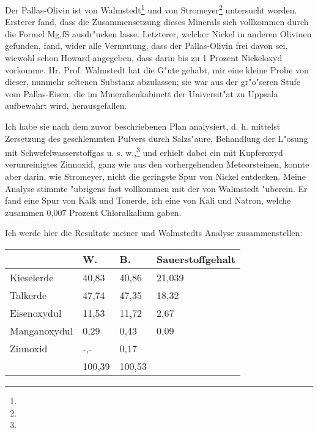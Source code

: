 \documentclass[a4paper, 11pt, oneside]{article}
\begin{document}
Der Pallas-Olivin ist von Walmstedt\footnote{} und von Stromeyer\footnote{} untersucht worden. Ersterer fand, dass die Zusammensetzung dieses Minerals sich vollkommen durch die Formel {Mg,f}S ausdr"ucken lasse. Letzterer, welcher Nickel in anderen Olivinen gefunden, fand, wider alle Vermutung, dass der Pallas-Olivin frei davon sei, wiewohl schon Howard angegeben, dass darin bis zu 1 Prozent Nickeloxyd vorkomme. Hr. Prof. Walmstedt hat die G"ute gehabt, mir eine kleine Probe von dieser, nunmehr seltenen Substanz abzulassen; sie war aus der gr"o"seren Stufe vom Pallas-Eisen, die im Mineralienkabinett der Universit"at zu Uppsala aufbewahrt wird, herausgefallen.

Ich habe sie nach dem zuvor beschriebenen Plan analysiert, d. h. mittelst Zersetzung des geschlemmten Pulvers durch Salzs"aure, Behandlung der L"osung mit Schwefelwasserstoffgas u. s. w.,\footnote{} und erhielt dabei ein mit Kupferoxyd verunreinigtes Zinnoxid, ganz wie aus den vorhergehenden Meteorsteinen, konnte aber darin, wie Stromeyer, nicht die geringste Spur von Nickel entdecken. Meine Analyse stimmte "ubrigens fast vollkommen mit der von Walmstedt "uberein. Er fand eine Spur von Kalk und Tonerde, ich eine von Kali und Natron, welche zusammen 0,007 Prozent Chloralkalium gaben.

Ich werde hier die Resultate meiner und Walmstedts Analyse zusammenstellen:
\begin{center}
\begin{tabular}{ |p{30mm}|p{20mm}|p{20mm}|p{35mm}| }
    \hline
      & W. & B. & Sauerstoffgehalt\\\hline
      Kieselerde & 40,83 & 40,86 & 21,039\\\hline
      Talkerde & 47,74 & 47,35 & 18,32\\\hline
      Eisenoxydul & 11,53 & 11,72 & 2,67\\\hline
      Manganoxydul & 0,29 & 0,43 & 0,09\\\hline
      Zinnoxid & -,- & 0,17  & \\\hline
       & 100,39 & 100,53 & \\
    \hline
\end{tabular}
\end{center}
\end{document}
